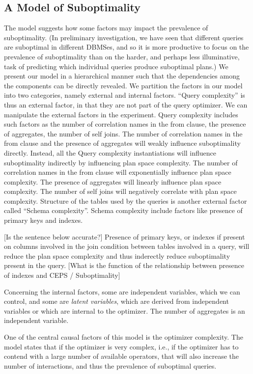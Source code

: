 \subsection{A Model of Suboptimality}
The model suggests how some factors may impact the prevalence of
suboptimality. (In preliminary investigation, we have seen that
different queries are suboptimal in different DBMSes, and so it is
more productive to focus on the prevalence of suboptimality than on
the harder, and perhaps less illuminative, task of predicting which
individual queries produce suboptimal plans.) We present our model in
a hierarchical manner such that the dependencies among the components
can be directly revealed. We partition the factors in our model into
two categories, namely external and internal factors. ``Query
complexity'' is thus an external factor, in that they are not part of
the query optimizer. We can manipulate the external factors in the
experiment. Query complexity includes such factors as the number of
correlation names in the from clause, the presence of aggregates, the
number of self joins. The number of correlation names in the from
clause and the presence of aggregates will weakly influence
suboptimality directly. Instead, all the Query complexity
instantiations will influence suboptimality indirectly by influencing
plan space complexity. The number of correlation names in the from
clause will exponentially influence plan space complexity. The
presence of aggregates will linearly influence plan space complexity.
The number of self joins will negatively correlate with plan space
complexity. Structure of the tables used by the queries is another
external factor called ``Schema complexity''. Schema complexity
include factors like presence of primary keys and indexes.

[Is the sentence below accurate?]
Presence of primary keys, or indexes if present on columns involved in
the join condition between tables involved in a query, will reduce the
plan space complexity and thus inderectly reduce suboptimality present
in the query. [What is the function of the relationship between
presence of indexes and CEPS / Suboptimality]

Concerning the internal factors, some are independent variables, which
we can control, and some are {\em latent variables}, which are derived
from independent variables or which are internal to the optimizer. The
number of aggregates is an independent variable.

One of the central causal factors of this model is the optimizer
complexity. The model states that if the optimizer is very complex,
i.e., if the optimizer has to contend with a large number
of available operators, that will also increase the number of
interactions, and thus the
prevalence of suboptimal queries.

